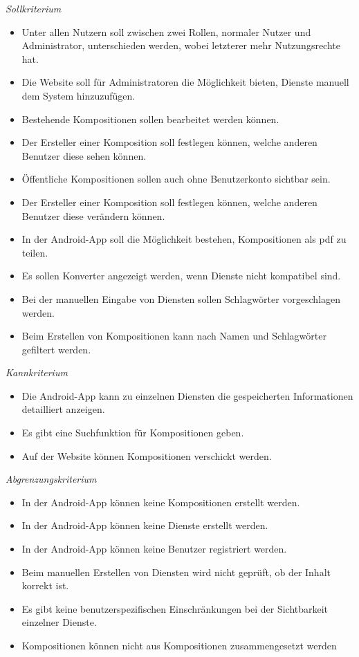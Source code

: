\textit{Sollkriterium}

\begin{itemize}[leftmargin=4pc]
	\item Unter allen Nutzern soll zwischen zwei Rollen, normaler Nutzer und Administrator, unterschieden werden, wobei letzterer mehr Nutzungsrechte hat.
	\item Die Website soll für Administratoren die Möglichkeit bieten, Dienste manuell dem System hinzuzufügen.
	\item Bestehende Kompositionen sollen bearbeitet werden können.
	\item Der Ersteller einer Komposition soll festlegen können, welche anderen Benutzer diese sehen können.
	\item Öffentliche Kompositionen sollen auch ohne Benutzerkonto sichtbar sein.
	\item Der Ersteller einer Komposition soll festlegen können, welche anderen Benutzer diese verändern können.
	\item In der Android-App soll die Möglichkeit bestehen, Kompositionen als pdf zu teilen.
	\item Es sollen Konverter angezeigt werden, wenn Dienste nicht kompatibel sind.
	\item Bei der manuellen Eingabe von Diensten sollen Schlagwörter vorgeschlagen werden.
	\item Beim Erstellen von Kompositionen kann nach Namen und Schlagwörter gefiltert werden.
\end{itemize}

\textit{Kannkriterium}

\begin{itemize}[leftmargin=4pc]
	\item Die Android-App kann zu einzelnen Diensten die gespeicherten Informationen detailliert anzeigen.
	\item Es gibt eine Suchfunktion für Kompositionen geben.
	\item Auf der Website können Kompositionen verschickt werden.
\end{itemize}

\textit{Abgrenzungskriterium}

\begin{itemize}[leftmargin=4pc]
	\item In der Android-App können keine Kompositionen erstellt werden.
	\item In der Android-App können keine Dienste erstellt werden.
	\item In der Android-App können keine Benutzer registriert werden.
	\item Beim manuellen Erstellen von Diensten wird nicht geprüft, ob der Inhalt korrekt ist.
	\item Es gibt keine benutzerspezifischen Einschränkungen bei der Sichtbarkeit einzelner Dienste. \\
	\item Kompositionen können nicht aus Kompositionen zusammengesetzt werden
\end{itemize}


